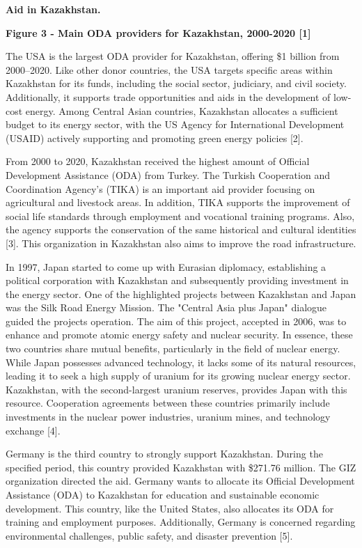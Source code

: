 {\bfseries Aid in Kazakhstan.}

{\bfseries Figure 3 - Main ODA providers for Kazakhstan, 2000-2020 {[}1{]}}

The USA is the largest ODA provider for Kazakhstan, offering \$1 billion
from 2000--2020. Like other donor countries, the USA targets specific
areas within Kazakhstan for its funds, including the social sector,
judiciary, and civil society. Additionally, it supports trade
opportunities and aids in the development of low-cost energy. Among
Central Asian countries, Kazakhstan allocates a sufficient budget to its
energy sector, with the US Agency for International Development (USAID)
actively supporting and promoting green energy policies {[}2{]}.

From 2000 to 2020, Kazakhstan received the highest amount of Official
Development Assistance (ODA) from Turkey. The Turkish Cooperation and
Coordination Agency's (TIKA) is an important aid provider focusing on
agricultural and livestock areas. In addition, TIKA supports the
improvement of social life standards through employment and vocational
training programs. Also, the agency supports the conservation of the
same historical and cultural identities {[}3{]}. This organization in
Kazakhstan also aims to improve the road infrastructure.

In 1997, Japan started to come up with Eurasian diplomacy, establishing
a political corporation with Kazakhstan and subsequently providing
investment in the energy sector. One of the highlighted projects between
Kazakhstan and Japan was the Silk Road Energy Mission. The "Central Asia
plus Japan" dialogue guided the project\textquotesingle s operation. The
aim of this project, accepted in 2006, was to enhance and promote atomic
energy safety and nuclear security. In essence, these two countries
share mutual benefits, particularly in the field of nuclear energy.
While Japan possesses advanced technology, it lacks some of its natural
resources, leading it to seek a high supply of uranium for its growing
nuclear energy sector. Kazakhstan, with the second-largest uranium
reserves, provides Japan with this resource. Cooperation agreements
between these countries primarily include investments in the nuclear
power industries, uranium mines, and technology exchange {[}4{]}.

Germany is the third country to strongly support Kazakhstan. During the
specified period, this country provided Kazakhstan with \$271.76
million. The GIZ organization directed the aid. Germany wants to
allocate its Official Development Assistance (ODA) to Kazakhstan for
education and sustainable economic development. This country, like the
United States, also allocates its ODA for training and employment
purposes. Additionally, Germany is concerned regarding environmental
challenges, public safety, and disaster prevention {[}5{]}.~

